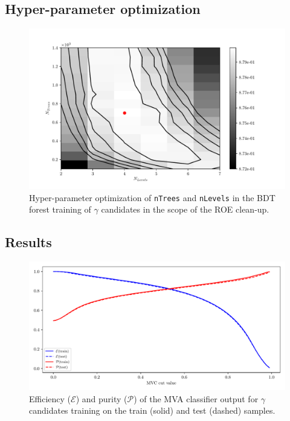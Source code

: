 \subsection*{Hyper-parameter optimization}

\begin{figure}[H]
\centering
\captionsetup{width=0.8\linewidth}
\includegraphics[width=\linewidth]{fig/addendums/gamma_hpo}
\caption{Hyper-parameter optimization of \texttt{nTrees} and \texttt{nLevels} in the BDT forest training of $\gamma$ candidates in the scope of the ROE clean-up.}
\end{figure}

\subsection*{Results}

\begin{figure}[H]
\centering
\captionsetup{width=0.8\linewidth}
\includegraphics[width=\linewidth]{fig/addendums/gamma_effpur}
\caption{Efficiency ($\mathcal{E}$) and purity ($\mathcal{P}$) of the MVA classifier output for $\gamma$ candidates training on the train (solid) and test (dashed) samples.}
\end{figure}


